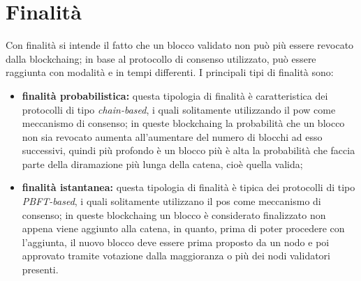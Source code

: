 \section{Finalità}

Con finalità si intende il fatto che un blocco validato non può più essere revocato dalla \gls{blockchaing}; in base al protocollo di consenso utilizzato, può essere raggiunta con modalità e in tempi differenti. I principali tipi di finalità sono:

\begin{itemize}
	\item \textbf{finalità probabilistica:} questa tipologia di finalità è caratteristica dei protocolli di tipo \textit{chain-based}, i quali solitamente utilizzando il \gls{pow} come meccanismo di consenso; in queste \gls{blockchaing} la probabilità che un blocco non sia revocato aumenta all'aumentare del numero di blocchi ad esso successivi, quindi più profondo è un blocco più è alta la probabilità che faccia parte della diramazione più lunga della catena, cioè quella valida;
	\item \textbf{finalità istantanea:} questa tipologia di finalità è tipica dei protocolli di tipo \textit{PBFT-based}, i quali solitamente utilizzano il \gls{pos} come meccanismo di consenso; in queste \gls{blockchaing} un blocco è considerato finalizzato non appena viene aggiunto alla catena, in quanto, prima di poter procedere con l'aggiunta, il nuovo blocco deve essere prima proposto da un nodo e poi approvato tramite votazione dalla maggioranza o più dei nodi validatori presenti.
\end{itemize}
